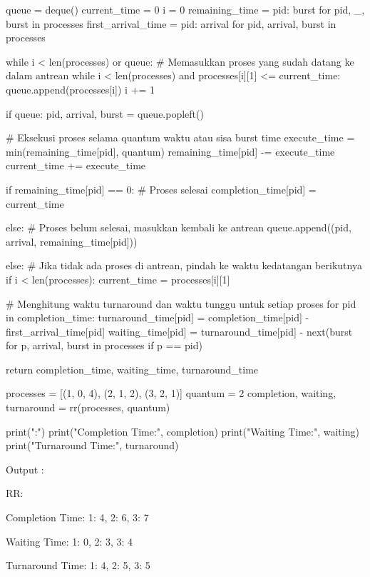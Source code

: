 \documentclass[12pt]{article}
\begin{document}
\begin{enumerate}
\begin{python}
    queue = deque()
    current_time = 0
    i = 0
    remaining_time = {pid: burst for pid, _, burst in processes}
    first_arrival_time = {pid: arrival for pid, arrival, burst in processes}

    while i < len(processes) or queue:
        # Memasukkan proses yang sudah datang ke dalam antrean
        while i < len(processes) and processes[i][1] <= current_time:
            queue.append(processes[i])
            i += 1
        
        if queue:
            pid, arrival, burst = queue.popleft()
            
            # Eksekusi proses selama quantum waktu atau sisa burst time
            execute_time = min(remaining_time[pid], quantum)
            remaining_time[pid] -= execute_time
            current_time += execute_time

            if remaining_time[pid] == 0:  # Proses selesai
                completion_time[pid] = current_time
            
            else:  # Proses belum selesai, masukkan kembali ke antrean
                queue.append((pid, arrival, remaining_time[pid]))
        
        else:
            # Jika tidak ada proses di antrean, pindah ke waktu kedatangan berikutnya
            if i < len(processes):
                current_time = processes[i][1]  

    # Menghitung waktu turnaround dan waktu tunggu untuk setiap proses
    for pid in completion_time:
        turnaround_time[pid] = completion_time[pid] - first_arrival_time[pid]
        waiting_time[pid] = turnaround_time[pid] - next(burst for p, arrival, burst in processes if p == pid)

    return completion_time, waiting_time, turnaround_time

processes = [(1, 0, 4), (2, 1, 2), (3, 2, 1)]
quantum = 2
completion, waiting, turnaround = rr(processes, quantum)

print("\nRR:")
print("Completion Time:", completion)
print("Waiting Time:", waiting)
print("Turnaround Time:", turnaround)
\end{python}
        Output : 
        \par RR:
        \par Completion Time: {1: 4, 2: 6, 3: 7}
        \par Waiting Time: {1: 0, 2: 3, 3: 4}
        \par Turnaround Time: {1: 4, 2: 5, 3: 5}
        

\end{enumerate}
\end{document}
